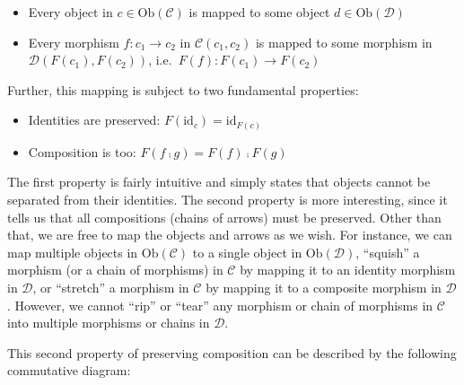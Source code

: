 \documentclass[
]{book}
\providecommand{\tightlist}{%
  \setlength{\itemsep}{0pt}\setlength{\parskip}{0pt}}
\theoremstyle{definition}
\theoremstyle{definition}
\theoremstyle{definition}
\theoremstyle{definition}
\theoremstyle{remark}
\begin{document}
\begin{itemize}
\tightlist
\item
  Every object in \(c \in \text{Ob}(\mathcal{C})\) is mapped to some object \(d \in \text{Ob}(\mathcal{D})\)
\item
  Every morphism \(f: c_1 \to c_2\) in \(\mathcal{C}(c_1, c_2)\) is mapped to some morphism in \(\mathcal{D}(F(c_1), F(c_2))\), i.e.~\(F(f): F(c_1) \to F(c_2)\)
\end{itemize}

Further, this mapping is subject to two fundamental properties:

\begin{itemize}
\tightlist
\item
  Identities are preserved: \(F(\text{id}_c) = \text{id}_{F(c)}\)
\item
  Composition is too: \(F(f ⨾g) = F(f) ⨾F(g)\)
\end{itemize}

The first property is fairly intuitive and simply states that objects cannot be separated from their identities. The second property is more interesting, since it tells us that all compositions (chains of arrows) must be preserved. Other than that, we are free to map the objects and arrows as we wish. For instance, we can map multiple objects in \(\text{Ob}(\mathcal{C})\) to a single object in \(\text{Ob}(\mathcal{D})\), ``squish'' a morphism (or a chain of morphisms) in \(\mathcal{C}\) by mapping it to an identity morphism in \(\mathcal{D}\), or ``stretch'' a morphism in \(\mathcal{C}\) by mapping it to a composite morphism in \(\mathcal{D}\). However, we cannot ``rip'' or ``tear'' any morphism or chain of morphisms in \(\mathcal{C}\) into multiple morphisms or chains in \(\mathcal{D}\).

This second property of preserving composition can be described by the following commutative diagram:
\end{document}
